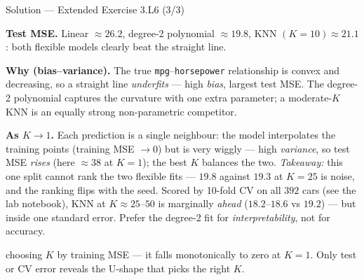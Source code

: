 \documentclass[aspectratio=169,11pt]{beamer}
\begin{document}
\begin{frame}{Solution --- Extended Exercise 3.L6 (3/3)}
  \begin{solutionbox}
    \textbf{Test MSE.} Linear $\approx 26.2$, degree-2 polynomial
    $\approx 19.8$, KNN $(K{=}10)\approx 21.1$: both flexible models
    clearly beat the straight line.

    \textbf{Why (bias--variance).} The true \texttt{mpg}--\texttt{horsepower}
    relationship is convex and decreasing, so a straight line
    \emph{underfits} --- high \emph{bias}, largest test MSE. The degree-2
    polynomial captures the curvature with one extra parameter; a
    moderate-$K$ KNN is an equally strong non-parametric competitor.

    \textbf{As $K\to 1$.} Each prediction is a single neighbour: the model
    interpolates the training points (training MSE $\to 0$) but is very
    wiggly --- high \emph{variance}, so test MSE \emph{rises} (here
    $\approx 38$ at $K{=}1$); the best $K$ balances the two.
    \emph{Takeaway:} this one split cannot rank the two flexible fits ---
    $19.8$ against $19.3$ at $K{=}25$ is noise, and the ranking flips with
    the seed. Scored by 10-fold CV on all $392$ cars (see the lab notebook),
    KNN at $K\approx25$--$50$ is marginally \emph{ahead} ($18.2$--$18.6$ vs
    $19.2$) --- but inside one standard error. Prefer the degree-2 fit for
    \emph{interpretability}, not for accuracy.
  \end{solutionbox}
  \begin{mistake}
    choosing $K$ by training MSE --- it falls
    monotonically to zero at $K=1$. Only test or CV error reveals the
    U-shape that picks the right $K$.
  \end{mistake}
\end{frame}
\end{document}
